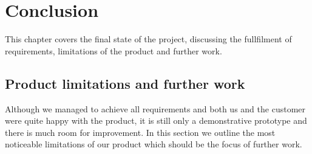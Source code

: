 \chapter{Conclusion}
\label{ch:conclusion}

This chapter covers the final state of the project, discussing the fullfilment
of requirements, limitations of the product and further work.

\iffalse
\section{Product limitations and further work}
Although we managed to achieve all requirements and both us and the customer were quite happy
with the product, it is still only a demonstrative prototype and there is much room for improvement.
In this section we outline the most noticeable limitations of our product which should be
the focus of further work.

